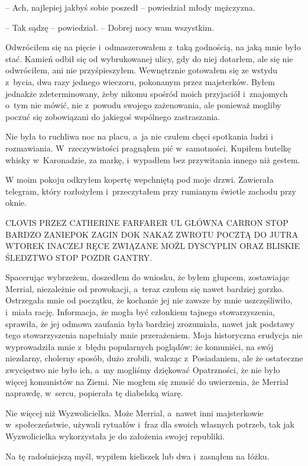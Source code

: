 \documentclass[oneside,polish,11pt,sfheadings]{mwbk}
\begin{document}
-- Ach, najlepiej jakbyś sobie poszedł -- powiedział młody mężczyzna.

-- Tak sądzę -- powiedział. -- Dobrej nocy wam wszystkim.

Odwróciłem się na pięcie i~odmaszerowałem z~taką godnością, na jaką mnie
było stać. Kamień odbił się od wybrukowanej ulicy, gdy do niej dotarłem,
ale się nie odwróciłem, ani nie przyśpieszyłem. Wewnętrznie gotowałem
się ze wstydu z~bycia, dwa razy jednego wieczoru, pokonanym przez
majsterków. Byłem jednakże zdeterminowany, żeby nikomu spośród moich
przyjaciół i~znajomych o~tym nie mówić, nie z~powodu swojego
zażenowania, ale ponieważ mogliby poczuć się zobowiązani do jakiegoś
wspólnego zastraszania.

Nie była to ruchliwa noc na placu, a~ja nie czułem chęci spotkania ludzi
i rozmawiania. W~rzeczywistości pragnąłem pić w~samotności. Kupiłem
butelkę whisky w~Karonadzie, za markę, i~wypadłem bez przywitania innego
niż gestem.

W moim pokoju odkryłem kopertę wepchniętą pod moje drzwi. Zawierała
telegram, który rozłożyłem i~przeczytałem przy rumianym świetle zachodu
przy oknie.

CLOVIS PRZEZ CATHERINE FARFARER UL GŁÓWNA CARRON STOP BARDZO ZANIEPOK
ZAGIN DOK NAKAZ ZWROTU POCZTĄ DO JUTRA WTOREK INACZEJ RĘCE ZWIĄZANE MOŻL
DYSCYPLIN ORAZ BLISKIE ŚLEDZTWO STOP POZDR GANTRY.

Spacerując wybrzeżem, doszedłem do wniosku, że byłem głupcem,
zostawiając Merrial, niezależnie od prowokacji, a~teraz czułem się nawet
bardziej gorzko. Ostrzegała mnie od początku, że kochanie jej nie zawsze
by mnie uszczęśliwiło, i~miała rację. Informacja, że mogła być
członkiem tajnego stowarzyszenia, sprawiła, że jej odmowa zaufania była
bardziej zrozumiała, nawet jak podstawy tego stowarzyszenia napełniały
mnie przerażeniem. Moja historyczna erudycja nie wyprowadziła mnie z~błędu popularnych poglądów: że komuniści, na swój niezdarny, cholerny
sposób, dużo zrobili, walcząc z~Posiadaniem, ale że ostateczne
zwycięstwo nie było ich, a~my mogliśmy dziękować Opatrzności, że nie
było więcej komunistów na Ziemi. Nie mogłem się zmusić do uwierzenia, że
Merrial naprawdę, w~sercu, popierała tę diabelską wiarę.

Nie więcej niż Wyzwolicielka. Może Merrial, a~nawet inni majsterkowie w~społeczeństwie, używali rytuałów i~fraz dla swoich własnych potrzeb, tak
jak Wyzwolicielka wykorzystała je do założenia swojej republiki.

Na tę radośniejszą myśl, wypiłem kieliszek lub dwa i~zasnąłem na łóżku.
\end{document}
